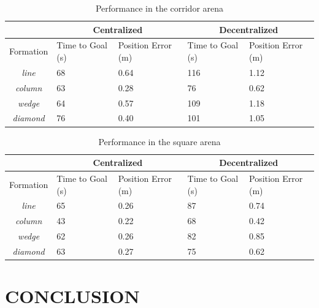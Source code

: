 \documentclass[letterpaper, 10 pt, conference]{ieeeconf}  %
\begin{document}
\begin{table}[tb]
\caption{Performance in the corridor arena}
\label{tab:results_corridor}
\begin{tabular}{|c|p{1cm}p{1.2cm}|p{1cm}p{1.2cm}|}
\hline
 & \multicolumn{2}{|c|}{Centralized} & \multicolumn{2}{|c|}{Decentralized} \\
\hline
Formation & Time to Goal (s) & Position Error (m) & Time to Goal (s) & Position Error (m) \\
\hline
\textit{line}        & 68                     & 0.64               & 116                   & 1.12 \\
\textit{column}   & 63                     & 0.28               & 76                    & 0.62 \\
\textit{wedge}    & 64                     & 0.57               & 109                  & 1.18 \\
\textit{diamond} & 76                     & 0.40               & 101                   & 1.05 \\
\hline
\end{tabular}
\end{table}

\begin{table}[tb]
\caption{Performance in the square arena}
\label{tab:results_square}
\begin{tabular}{|c|p{1cm}p{1.2cm}|p{1cm}p{1.2cm}|}
\hline
 & \multicolumn{2}{|c|}{Centralized} & \multicolumn{2}{|c|}{Decentralized} \\
\hline
Formation & Time to Goal (s) & Position Error (m) & Time to Goal (s) & Position Error (m) \\
\hline
\textit{line}        & 65                     & 0.26               & 87                     & 0.74 \\
\textit{column}   & 43                     & 0.22               & 68                     & 0.42 \\
\textit{wedge}    & 62                     & 0.26               & 82                     & 0.85 \\
\textit{diamond} & 63                     & 0.27               & 75                     & 0.62 \\
\hline
\end{tabular}
\end{table}

\section{CONCLUSION}
\end{document}
